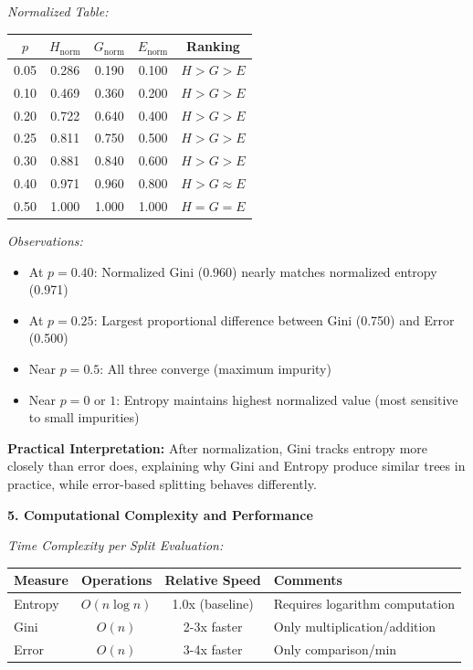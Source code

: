 \documentclass[12pt]{article}
\begin{document}
\begin{explanation}
\textit{Normalized Table:}

\begin{center}
\begin{tabular}{|c|c|c|c|c|}
\hline
\textbf{$p$} & \textbf{$H_{\text{norm}}$} & \textbf{$G_{\text{norm}}$} & \textbf{$E_{\text{norm}}$} & \textbf{Ranking} \\
\hline
0.05 & 0.286 & 0.190 & 0.100 & $H > G > E$ \\
0.10 & 0.469 & 0.360 & 0.200 & $H > G > E$ \\
0.20 & 0.722 & 0.640 & 0.400 & $H > G > E$ \\
0.25 & 0.811 & 0.750 & 0.500 & $H > G > E$ \\
0.30 & 0.881 & 0.840 & 0.600 & $H > G > E$ \\
0.40 & 0.971 & 0.960 & 0.800 & $H > G \approx E$ \\
0.50 & 1.000 & 1.000 & 1.000 & $H = G = E$ \\
\hline
\end{tabular}
\end{center}

\textit{Observations:}

\begin{itemize}
    \item At $p=0.40$: Normalized Gini (0.960) nearly matches normalized entropy (0.971)
    \item At $p=0.25$: Largest proportional difference between Gini (0.750) and Error (0.500)
    \item Near $p=0.5$: All three converge (maximum impurity)
    \item Near $p=0$ or $1$: Entropy maintains highest normalized value (most sensitive to small impurities)
\end{itemize}

\textbf{Practical Interpretation:} After normalization, Gini tracks entropy more closely than error does, explaining why Gini and Entropy produce similar trees in practice, while error-based splitting behaves differently.

\textbf{5. Computational Complexity and Performance}

\textit{Time Complexity per Split Evaluation:}

\begin{center}
\begin{tabular}{|l|c|c|l|}
\hline
\textbf{Measure} & \textbf{Operations} & \textbf{Relative Speed} & \textbf{Comments} \\
\hline
Entropy & $O(n \log n)$ & 1.0x (baseline) & Requires logarithm computation \\
Gini & $O(n)$ & 2-3x faster & Only multiplication/addition \\
Error & $O(n)$ & 3-4x faster & Only comparison/min \\
\hline
\end{tabular}
\end{center}


\end{explanation}
\end{document}
